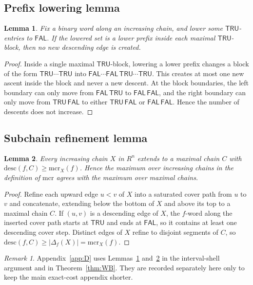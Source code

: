 \documentclass[11pt]{article}
\newtheorem{lemma}{Lemma}
\theoremstyle{remark}
\newtheorem*{remark}{Remark}
\newcommand{\FAL}{\ensuremath{\mathsf{FAL}}}
\newcommand{\TRU}{\ensuremath{\mathsf{TRU}}}
\newcommand{\mcr}{\ensuremath{\mathrm{mcr}}}
\newcommand{\desc}{\mathrm{desc}}
\begin{document}
\subsection{Prefix lowering lemma}

\begin{lemma}\label{lem:E3}
Fix a binary word along an increasing chain, and lower some $\TRU$-entries
to $\FAL$. If the lowered set is a lower prefix inside each maximal
$\TRU$-block, then no new descending edge is created.
\end{lemma}

\begin{proof}
Inside a single maximal $\TRU$-block, lowering a lower prefix changes a
block of the form $\TRU\cdots\TRU$ into
$\FAL\cdots\FAL\,\TRU\cdots\TRU$. This creates at most one new ascent
inside the block and never a new descent. At the block boundaries, the
left boundary can only move from $\FAL\,\TRU$ to $\FAL\,\FAL$, and the
right boundary can only move from $\TRU\,\FAL$ to either $\TRU\,\FAL$ or
$\FAL\,\FAL$. Hence the number of descents does not increase.
\end{proof}

\subsection{Subchain refinement lemma}

\begin{lemma}\label{lem:E4}
Every increasing chain $X$ in $R^n$ extends to a maximal chain $C$ with
$\desc(f,C)\ge\mcr_X(f)$. Hence the maximum over increasing chains in the
definition of $\mcr$ agrees with the maximum over maximal chains.
\end{lemma}

\begin{proof}
Refine each upward edge $u<v$ of $X$ into a saturated cover path from $u$
to $v$ and concatenate, extending below the bottom of $X$ and above its top
to a maximal chain $C$. If $(u,v)$ is a descending edge of $X$, the
$f$-word along the inserted cover path starts at $\TRU$ and ends at $\FAL$,
so it contains at least one descending cover step. Distinct edges of $X$
refine to disjoint segments of $C$, so
$\desc(f,C)\ge|\Delta_f(X)|=\mcr_X(f)$.
\end{proof}

\begin{remark}
Appendix~\ref{app:D} uses Lemmas~\ref{lem:E3} and~\ref{lem:E4} in the
interval-shell argument and in Theorem~\ref{thm:WB}. They are recorded
separately here only to keep the main exact-cost appendix shorter.
\end{remark}
\end{document}
